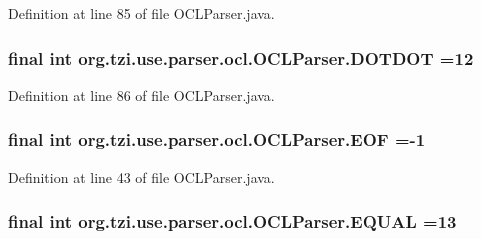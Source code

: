 Definition at line 85 of file O\-C\-L\-Parser.\-java.

\hypertarget{classorg_1_1tzi_1_1use_1_1parser_1_1ocl_1_1_o_c_l_parser_ac8f68e93203552180b7dbb2d77cd2375}{
\subsubsection[{D\-O\-T\-D\-O\-T}]{\setlength{\rightskip}{0pt plus 5cm}final int org.\-tzi.\-use.\-parser.\-ocl.\-O\-C\-L\-Parser.\-D\-O\-T\-D\-O\-T =12\hspace{0.3cm}{\ttfamily [static]}}}\label{classorg_1_1tzi_1_1use_1_1parser_1_1ocl_1_1_o_c_l_parser_ac8f68e93203552180b7dbb2d77cd2375}


Definition at line 86 of file O\-C\-L\-Parser.\-java.

\hypertarget{classorg_1_1tzi_1_1use_1_1parser_1_1ocl_1_1_o_c_l_parser_aabc1e41c8b92d920c6389d8670299a59}{
\subsubsection[{E\-O\-F}]{\setlength{\rightskip}{0pt plus 5cm}final int org.\-tzi.\-use.\-parser.\-ocl.\-O\-C\-L\-Parser.\-E\-O\-F =-\/1\hspace{0.3cm}{\ttfamily [static]}}}\label{classorg_1_1tzi_1_1use_1_1parser_1_1ocl_1_1_o_c_l_parser_aabc1e41c8b92d920c6389d8670299a59}


Definition at line 43 of file O\-C\-L\-Parser.\-java.

\hypertarget{classorg_1_1tzi_1_1use_1_1parser_1_1ocl_1_1_o_c_l_parser_a65674fd652ef7ad5a90d741d6ab8e254}{
\subsubsection[{E\-Q\-U\-A\-L}]{\setlength{\rightskip}{0pt plus 5cm}final int org.\-tzi.\-use.\-parser.\-ocl.\-O\-C\-L\-Parser.\-E\-Q\-U\-A\-L =13\hspace{0.3cm}{\ttfamily [static]}}}\label{classorg_1_1tzi_1_1use_1_1parser_1_1ocl_1_1_o_c_l_parser_a65674fd652ef7ad5a90d741d6ab8e254}


